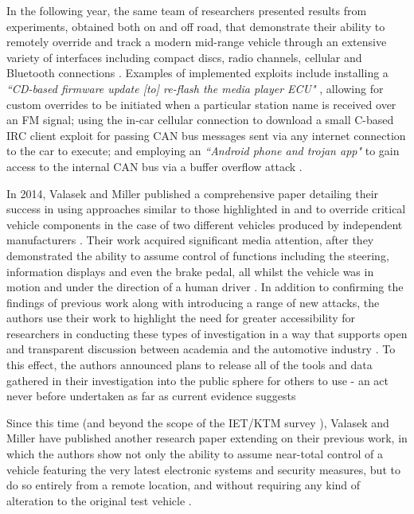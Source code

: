 \documentclass[conference]{IEEEtran}
\begin{document}
In the following year, the same team of researchers presented results from experiments, obtained both on and off road, that demonstrate their ability to remotely override and track a modern mid-range vehicle through an extensive variety of interfaces including compact discs, radio channels, cellular and Bluetooth connections \cite{koscher-2}. Examples of implemented exploits include installing a \textit{``CD-based firmware update [to] re-flash the media player ECU"} \cite{koscher-2}, allowing for custom overrides to be initiated when a particular station name is received over an FM signal; using the in-car cellular connection to download a small C-based IRC client exploit for passing CAN bus messages sent via any internet connection to the car to execute; and employing an \textit{``Android phone and trojan app"} to gain access to the internal CAN bus via a buffer overflow attack \cite{koscher-2}.

In 2014, Valasek and Miller published a comprehensive paper detailing their success in using approaches similar to those highlighted in \cite{koscher-1} and \cite{koscher-2} to override critical vehicle components in the case of two  different vehicles produced by independent manufacturers \cite{valasek-1}. Their work acquired significant media attention, after they demonstrated the ability to assume control of functions including the steering, information displays and even the brake pedal, all whilst the vehicle was in motion and under the direction of a human driver \cite{forbes} \cite{bbc-valasek}. In addition to confirming the findings of previous work \cite{koscher-1, koscher-2} along with introducing a range of new attacks, the authors use their work to highlight the need for greater accessibility for researchers in conducting these types of investigation in a way that supports open and transparent discussion between academia and the automotive industry \cite{valasek-1}. To this effect, the authors announced plans to release all of the tools and data gathered in their investigation into the public sphere for others to use - an act never before undertaken as far as current evidence suggests \cite{valasek-1} 

Since this time (and beyond the scope of the IET/KTM survey \cite{iet}), Valasek and Miller have published another research paper extending on their previous work, in which the authors show not only the ability to assume near-total control of a vehicle featuring the very latest electronic systems and security measures, but to do so entirely from a remote location, and without requiring any kind of alteration to the original test vehicle \cite{valasek-2}. 
\end{document}
